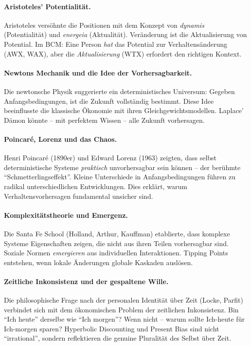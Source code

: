 \paragraph{Aristoteles' Potentialität.}
Aristoteles versöhnte die Positionen mit dem Konzept von \textit{dynamis} (Potentialität) und \textit{energeia} (Aktualität). Veränderung ist die Aktualisierung von Potential. Im BCM: Eine Person \textit{hat} das Potential zur Verhaltensänderung (AWX, WAX), aber die \textit{Aktualisierung} (WTX) erfordert den richtigen Kontext.

\paragraph{Newtons Mechanik und die Idee der Vorhersagbarkeit.}
Die newtonsche Physik suggerierte ein deterministisches Universum: Gegeben Anfangsbedingungen, ist die Zukunft vollständig bestimmt. Diese Idee beeinflusste die klassische Ökonomie mit ihren Gleichgewichtsmodellen. Laplace' Dämon könnte -- mit perfektem Wissen -- alle Zukunft vorhersagen.

\paragraph{Poincaré, Lorenz und das Chaos.}
Henri Poincaré (1890er) und Edward Lorenz (1963) zeigten, dass selbst deterministische Systeme \textit{praktisch} unvorhersagbar sein können -- der berühmte ``Schmetterlingseffekt''. Kleine Unterschiede in Anfangsbedingungen führen zu radikal unterschiedlichen Entwicklungen. Dies erklärt, warum Verhaltensvorhersagen fundamental unsicher sind.

\paragraph{Komplexitätstheorie und Emergenz.}
Die Santa Fe School (Holland, Arthur, Kauffman) etablierte, dass komplexe Systeme Eigenschaften zeigen, die nicht aus ihren Teilen vorhersagbar sind. Soziale Normen \textit{emergieren} aus individuellen Interaktionen. Tipping Points entstehen, wenn lokale Änderungen globale Kaskaden auslösen.

\paragraph{Zeitliche Inkonsistenz und der gespaltene Wille.}
Die philosophische Frage nach der personalen Identität über Zeit (Locke, Parfit) verbindet sich mit dem ökonomischen Problem der zeitlichen Inkonsistenz. Bin ``Ich heute'' derselbe wie ``Ich morgen''? Wenn nicht -- warum sollte Ich-heute für Ich-morgen sparen? Hyperbolic Discounting und Present Bias sind nicht ``irrational'', sondern reflektieren die genuine Pluralität des Selbst über Zeit.

